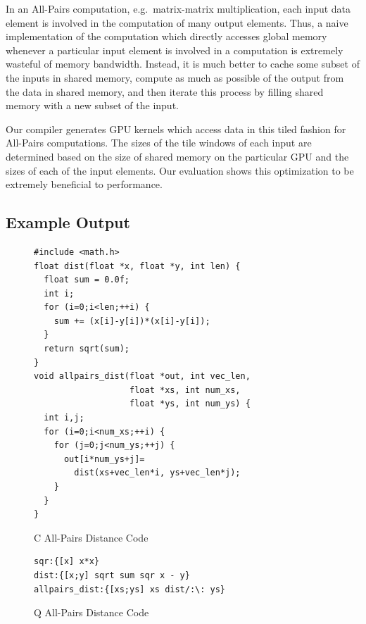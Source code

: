 \documentclass[preprint]{sigplanconf}
\begin{document}
In an All-Pairs computation, e.g.\ matrix-matrix multiplication, each input data element is involved in the computation of many output elements.  Thus, a naive implementation of the computation which directly accesses global memory whenever a particular input element is involved in a computation is extremely wasteful of memory bandwidth.  Instead, it is much better to cache some subset of the inputs in shared memory, compute as much as possible of the output from the data in shared memory, and then iterate this process by filling shared memory with a new subset of the input.

Our compiler generates GPU kernels which access data in this tiled fashion for All-Pairs computations.  The sizes of the tile windows of each input are determined based on the size of shared memory on the particular GPU and the sizes of each of the input elements.  Our evaluation shows this optimization to be extremely beneficial to performance.

\subsection{Example Output}

\begin{figure}
\begin{verbatim}
#include <math.h>
float dist(float *x, float *y, int len) {
  float sum = 0.0f;
  int i;
  for (i=0;i<len;++i) {
    sum += (x[i]-y[i])*(x[i]-y[i]);
  }
  return sqrt(sum);
}
void allpairs_dist(float *out, int vec_len,
                   float *xs, int num_xs,
                   float *ys, int num_ys) {
  int i,j;
  for (i=0;i<num_xs;++i) {
    for (j=0;j<num_ys;++j) {
      out[i*num_ys+j]=
        dist(xs+vec_len*i, ys+vec_len*j);
    }
  }
}
\end{verbatim}
\caption{C All-Pairs Distance Code}
\label{CAllPairs}
\end{figure}

\begin{figure}
\begin{verbatim}
sqr:{[x] x*x}
dist:{[x;y] sqrt sum sqr x - y}
allpairs_dist:{[xs;ys] xs dist/:\: ys}
\end{verbatim}
\caption{Q All-Pairs Distance Code}
\label{QAllPairs}
\end{figure}
\end{document}
